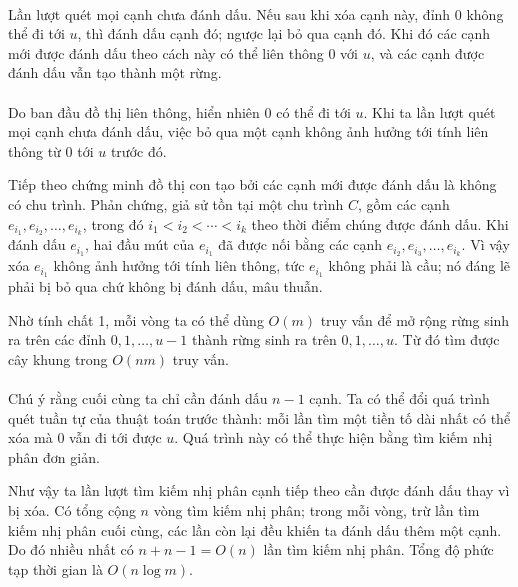 \documentclass[11pt]{article}
\begin{document}
\paragraph{}
Lần lượt quét mọi cạnh chưa đánh dấu. Nếu sau khi xóa cạnh này, đỉnh \(0\)
không thể đi tới \(u\), thì đánh dấu cạnh đó; ngược lại bỏ qua cạnh đó. Khi đó
các cạnh mới được đánh dấu theo cách này có thể liên thông \(0\) với \(u\), và
các cạnh được đánh dấu vẫn tạo thành một rừng.

\paragraph{}
Do ban đầu đồ thị liên thông, hiển nhiên \(0\) có thể đi tới \(u\). Khi ta lần
lượt quét mọi cạnh chưa đánh dấu, việc bỏ qua một cạnh không ảnh hưởng tới tính
liên thông từ \(0\) tới \(u\) trước đó.

Tiếp theo chứng minh đồ thị con tạo bởi các cạnh mới được đánh dấu là không có
chu trình. Phản chứng, giả sử tồn tại một chu trình \(C\), gồm các cạnh
\(e_{i_1},e_{i_2},\ldots,e_{i_k}\), trong đó \(i_1<i_2<\cdots<i_k\) theo thời
điểm chúng được đánh dấu. Khi đánh dấu \(e_{i_1}\), hai đầu mút của \(e_{i_1}\)
đã được nối bằng các cạnh \(e_{i_2},e_{i_3},\ldots,e_{i_k}\). Vì vậy xóa
\(e_{i_1}\) không ảnh hưởng tới tính liên thông, tức \(e_{i_1}\) không phải là
cầu; nó đáng lẽ phải bị bỏ qua chứ không bị đánh dấu, mâu thuẫn.

Nhờ tính chất 1, mỗi vòng ta có thể dùng \(O(m)\) truy vấn để mở rộng rừng sinh
ra trên các đỉnh \(0,1,\ldots,u-1\) thành rừng sinh ra trên
\(0,1,\ldots,u\). Từ đó tìm được cây khung trong \(O(nm)\) truy vấn.

\paragraph{}
Chú ý rằng cuối cùng ta chỉ cần đánh dấu \(n-1\) cạnh. Ta có thể đổi quá trình
quét tuần tự của thuật toán trước thành: mỗi lần tìm một tiền tố dài nhất có
thể xóa mà \(0\) vẫn đi tới được \(u\). Quá trình này có thể thực hiện bằng tìm
kiếm nhị phân đơn giản.

Như vậy ta lần lượt tìm kiếm nhị phân cạnh tiếp theo cần được đánh dấu thay vì
bị xóa. Có tổng cộng \(n\) vòng tìm kiếm nhị phân; trong mỗi vòng, trừ lần tìm
kiếm nhị phân cuối cùng, các lần còn lại đều khiến ta đánh dấu thêm một cạnh.
Do đó nhiều nhất có \(n+n-1=O(n)\) lần tìm kiếm nhị phân. Tổng độ phức tạp thời
gian là \(O(n\log m)\).
\end{document}
